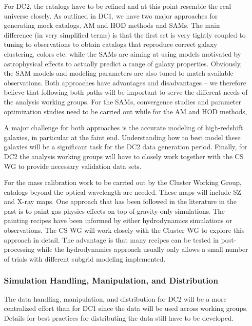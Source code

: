 For DC2, the catalogs have to be refined and at this point resemble the real universe closely. As outlined in DC1, we have two major approaches for generating mock catalogs, AM and HOD methods and SAMs. The main difference (in very simplified terms) is that the first set is very tightly coupled to tuning to observations to obtain catalogs that reproduce correct galaxy clustering, colors etc. while the SAMs are aiming at using models motivated by astrophysical effects to actually predict a range of galaxy properties. Obviously, the SAM models and modeling parameters are also tuned to match available observations. Both approaches have advantages and disadvantages -- we therefore believe that following both paths will be important to serve the different needs of the analysis working groups. For the SAMs, convergence studies and parameter optimization studies need to be carried out while for the AM and HOD methods, 

A major challenge for both approaches is the accurate modeling of high-redshift galaxies, in particular at the faint end. Understanding how to best model these galaxies will be a significant task for the DC2 data generation period. 
Finally, for DC2 the analysis working groups will have to closely work together with the CS WG to provide necessary validation data sets.

For the mass calibration work to be carried out by the Cluster Working Group, catalogs beyond the optical wavelength are needed. These maps will include SZ and X-ray maps. One approach that has been followed in the literature in the past is to paint gas physics effects on top of gravity-only simulations. The painting recipes have been informed by either hydrodynamics simulations or observations. The CS WG will work closely with the Cluster WG to explore this approach in detail. The advantage is that many recipes can be tested in post-processing while the hydrodynamics approach usually only allows a small number of trials with different subgrid modeling implemented.


\subsubsection{Simulation Handling, Manipulation, and Distribution}
\label{sec:keysims:dc2:handling}

The data handling, manipulation, and distribution for DC2 will be a more centralized effort than for DC1 since the data will be used across working groups. Details for best practices for distributing the data still have to be developed.  

